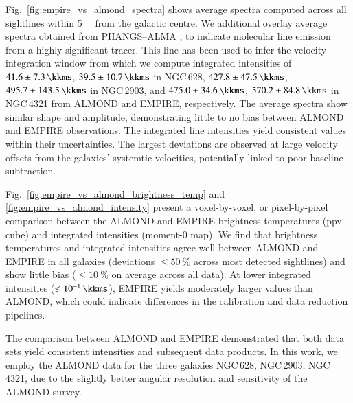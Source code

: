 \documentclass[letter, longauth]{aa} %
\begin{document}
\begin{appendix}
Fig.~\ref{fig:empire_vs_almond_spectra} shows average \hcnone spectra computed across all sightlines within \SI{5}{\kilo\parsec} from the galactic centre.
We additional overlay \cotwo average spectra obtained from PHANGS--ALMA \citep{Leroy2021b}, to indicate molecular line emission from a highly significant tracer.
This line has been used to infer the velocity-integration window from which we compute \hcnone integrated intensities of $41.6 \pm \SI{7.3}{\kkms}$, $39.5 \pm \SI{10.7}{\kkms}$ in NGC\,628, $427.8 \pm \SI{47.5}{\kkms}$, $495.7 \pm \SI{143.5}{\kkms}$ in NGC\,2903, and $475.0 \pm \SI{34.6}{\kkms}$, $570.2 \pm \SI{84.8}{\kkms}$ in NGC\,4321 from ALMOND and EMPIRE, respectively.
The average spectra show similar shape and amplitude, demonstrating little to no bias between ALMOND and EMPIRE observations.
The integrated line intensities yield consistent values within their uncertainties.
The largest deviations are observed at large velocity offsets from the galaxies' systemtic velocities, potentially linked to poor baseline subtraction.

Fig.~\ref{fig:empire_vs_almond_brightness_temp} and \ref{fig:empire_vs_almond_intensity} present a voxel-by-voxel, or pixel-by-pixel comparison between the ALMOND and EMPIRE \hcnone brightness temperatures (ppv cube) and integrated intensities (moment-0 map).
We find that brightness temperatures and integrated intensities agree well between ALMOND and EMPIRE in all galaxies (deviations $\leq\SI{50}{\percent}$ across most detected sightlines) and show little bias ($\leq\SI{10}{\percent}$ on average across all data).
At lower integrated intensities ($\lesssim\SI{e-1}{\kkms}$), EMPIRE yields moderately larger values than ALMOND, which could indicate differences in the calibration and data reduction pipelines.

The comparison between ALMOND and EMPIRE demonstrated that both data sets yield consistent \hcnone intensities and subsequent data products.
In this work, we employ the ALMOND data for the three galaxies NGC\,628, NGC\,2903, NGC\,4321, due to the slightly better angular resolution and sensitivity of the ALMOND survey.


\end{appendix}
\end{document}
